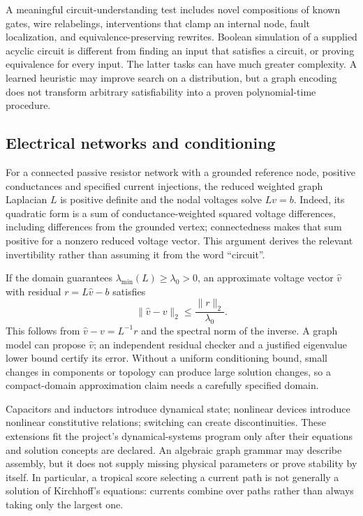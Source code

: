 A meaningful circuit-understanding test includes novel compositions of known gates, wire relabelings, interventions that clamp an internal node, fault localization, and equivalence-preserving rewrites. Boolean simulation of a supplied acyclic circuit is different from finding an input that satisfies a circuit, or proving equivalence for every input. The latter tasks can have much greater complexity. A learned heuristic may improve search on a distribution, but a graph encoding does not transform arbitrary satisfiability into a proven polynomial-time procedure.

\subsection{Electrical networks and conditioning}

For a connected passive resistor network with a grounded reference node, positive conductances and specified current injections, the reduced weighted graph Laplacian $L$ is positive definite and the nodal voltages solve $Lv=b$. Indeed, its quadratic form is a sum of conductance-weighted squared voltage differences, including differences from the grounded vertex; connectedness makes that sum positive for a nonzero reduced voltage vector. This argument derives the relevant invertibility rather than assuming it from the word ``circuit''.

If the domain guarantees $\lambda_{\min}(L)\ge\lambda_0>0$, an approximate voltage vector $\hat v$ with residual $r=L\hat v-b$ satisfies
\[
 \|\hat v-v\|_2\le\frac{\|r\|_2}{\lambda_0}.
\]
This follows from $\hat v-v=L^{-1}r$ and the spectral norm of the inverse. A graph model can propose $\hat v$; an independent residual checker and a justified eigenvalue lower bound certify its error. Without a uniform conditioning bound, small changes in components or topology can produce large solution changes, so a compact-domain approximation claim needs a carefully specified domain.

Capacitors and inductors introduce dynamical state; nonlinear devices introduce nonlinear constitutive relations; switching can create discontinuities. These extensions fit the project's dynamical-systems program only after their equations and solution concepts are declared. An algebraic graph grammar may describe assembly, but it does not supply missing physical parameters or prove stability by itself. In particular, a tropical score selecting a current path is not generally a solution of Kirchhoff's equations: currents combine over paths rather than always taking only the largest one.

